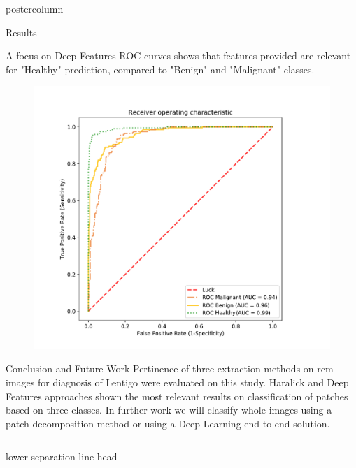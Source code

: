 \documentclass[final]{beamer}
\begin{document}
\begin{frame}
\begin{columns}[t]
\begin{column}{.49\textwidth}
\begin{beamercolorbox}[center,wd=\textwidth]{postercolumn}
\begin{minipage}[T]{.95\textwidth}
{\begin{block}{Results}
\begin{figure}
				\end{figure}
                A focus on Deep Features ROC curves shows that features provided are relevant for "Healthy" prediction, compared to "Benign" and "Malignant" classes.
                \begin{figure}
                    \includegraphics[width=0.65\linewidth]{content/figures/ROC.pdf}
				\end{figure}
            \end{block}
            \vspace{0.1in}
            \begin{block}{Conclusion and Future Work}
            \justifying
              Pertinence of three extraction methods on \ac{rcm} images for diagnosis of Lentigo were evaluated on this study. Haralick and Deep Features approaches shown the most relevant results on classification of patches based on three classes. In further work we will classify whole images using a patch decomposition method or using a Deep Learning end-to-end solution.
            \end{block}
            }
        \end{minipage}
    \end{beamercolorbox}    
	\end{column}
  \end{columns}

  \begin{beamercolorbox}[wd=\paperwidth]{lower separation line head}
    \rule{0pt}{3pt}
  \end{beamercolorbox}
  

\end{frame}
\end{document}
